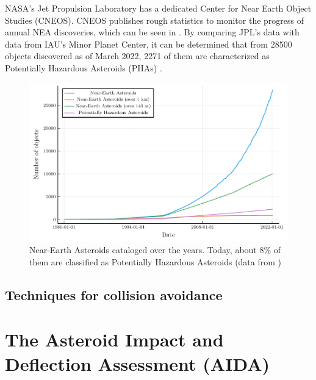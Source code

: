 NASA's Jet Propulsion Laboratory has a dedicated Center for Near Earth Object Studies (CNEOS). CNEOS publishes rough statistics to monitor the progress of annual NEA discoveries, which can be seen in . By comparing JPL's data with data from IAU's Minor Planet Center, it can be determined that from \num{28500} objects discovered as of March 2022, \num{2271} of them are characterized as Potentially Hazardous Asteroids (PHAs) \cite{mpc_data}. 

\begin{figure}[h]
	\centering
	\includegraphics[width=\textwidth]{Figures/Chapter1/jpl_nea_data.pdf}
	\caption{Near-Earth Asteroids cataloged over the years. Today, about 8\% of them are classified as Potentially Hazardous Asteroids (data from \cite{nea_stats_jpl})}
	\label{fig:NEA_nasa}
\end{figure}

\subsection{Techniques for collision avoidance}
\label{ssec:collision_avoidance}


\section{The Asteroid Impact and Deflection Assessment (AIDA)}